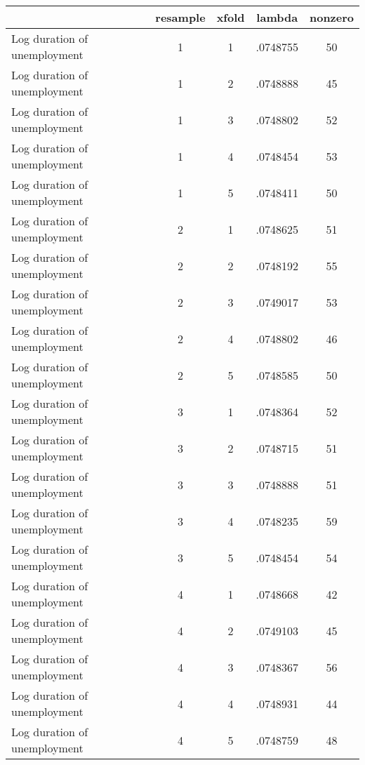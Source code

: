 \begin{tabular}{l*{4}{c}}
\hline\hline
                    &    resample&       xfold&      lambda&     nonzero\\
\hline
Log duration of unemployment&           1&           1&    .0748755&          50\\
Log duration of unemployment&           1&           2&    .0748888&          45\\
Log duration of unemployment&           1&           3&    .0748802&          52\\
Log duration of unemployment&           1&           4&    .0748454&          53\\
Log duration of unemployment&           1&           5&    .0748411&          50\\
Log duration of unemployment&           2&           1&    .0748625&          51\\
Log duration of unemployment&           2&           2&    .0748192&          55\\
Log duration of unemployment&           2&           3&    .0749017&          53\\
Log duration of unemployment&           2&           4&    .0748802&          46\\
Log duration of unemployment&           2&           5&    .0748585&          50\\
Log duration of unemployment&           3&           1&    .0748364&          52\\
Log duration of unemployment&           3&           2&    .0748715&          51\\
Log duration of unemployment&           3&           3&    .0748888&          51\\
Log duration of unemployment&           3&           4&    .0748235&          59\\
Log duration of unemployment&           3&           5&    .0748454&          54\\
Log duration of unemployment&           4&           1&    .0748668&          42\\
Log duration of unemployment&           4&           2&    .0749103&          45\\
Log duration of unemployment&           4&           3&    .0748367&          56\\
Log duration of unemployment&           4&           4&    .0748931&          44\\
Log duration of unemployment&           4&           5&    .0748759&          48\\

\end{tabular}
